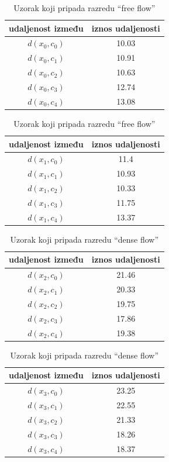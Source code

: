 \documentclass[times, utf8, zavrsni, numeric]{fer}
\begin{document}
\begin{table}[ht]
\parbox{.45\linewidth}{
\centering
\begin{tabular}{c|c}
udaljenost između & iznos udaljenosti \\
\hline
\(d(x_0, c_0)\) & 10.03 \\
\(d(x_0, c_1)\) & 10.91 \\
\(d(x_0, c_2)\) & 10.63 \\
\(d(x_0, c_3)\) & 12.74 \\
\(d(x_0, c_4)\) & 13.08 \\
\end{tabular}
\caption{Uzorak koji pripada razredu \enquote{no flow}}
}
\hfill
\parbox{.45\linewidth}{
\centering
\begin{tabular}{c|c}
udaljenost između & iznos udaljenosti \\
\hline
\(d(x_1, c_0)\) & 11.4 \\
\(d(x_1, c_1)\) & 10.93 \\
\(d(x_1, c_2)\) & 10.33 \\
\(d(x_1, c_3)\) & 11.75 \\
\(d(x_1, c_4)\) & 13.37 \\
\end{tabular}
\caption{Uzorak koji pripada razredu \enquote{free flow}}
}
\end{table}
\vspace{-1.5em}
\begin{table}[ht]
\parbox{.45\linewidth}{
\centering
\begin{tabular}{c|c}
udaljenost između & iznos udaljenosti \\
\hline
\(d(x_2, c_0)\) & 21.46 \\
\(d(x_2, c_1)\) & 20.33 \\
\(d(x_2, c_2)\) & 19.75 \\
\(d(x_2, c_3)\) & 17.86 \\
\(d(x_2, c_4)\) & 19.38 \\
\end{tabular}
\caption{Uzorak koji pripada razredu \enquote{restricted flow}}
}
\hfill
\parbox{.45\linewidth}{
\centering
\begin{tabular}{c|c}
udaljenost između & iznos udaljenosti \\
\hline
\(d(x_3, c_0)\) & 23.25 \\
\(d(x_3, c_1)\) & 22.55 \\
\(d(x_3, c_2)\) & 21.33 \\
\(d(x_3, c_3)\) & 18.26 \\
\(d(x_3, c_4)\) & 18.37 \\
\end{tabular}
\caption{Uzorak koji pripada razredu \enquote{dense flow}}
}
\end{table}
\end{document}
